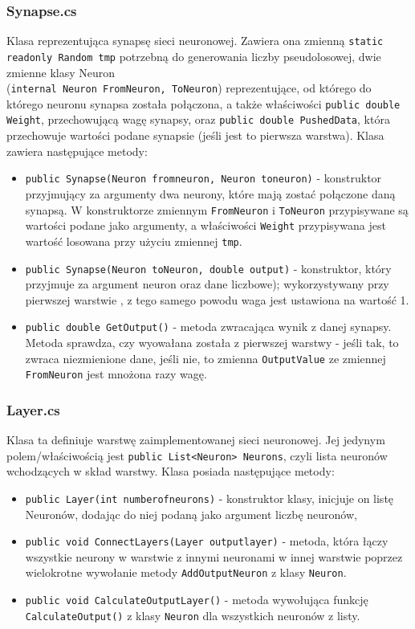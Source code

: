 \documentclass[12pt,a4paper]{article}
\begin{document}
\subsubsection*{Synapse.cs}
 \hspace{20pt} Klasa reprezentująca synapsę sieci neuronowej. Zawiera ona zmienną \lstinline{static readonly Random tmp} potrzebną do generowania liczby pseudolosowej, dwie zmienne klasy Neuron \\ (\lstinline{internal Neuron FromNeuron, ToNeuron}) reprezentujące, od którego do którego neuronu synapsa została połączona, a także właściwości \lstinline{public double Weight}, przechowującą wagę synapsy, oraz \lstinline{public double PushedData}, która przechowuje wartości podane synapsie (jeśli jest to pierwsza warstwa). Klasa zawiera następujące metody:
\begin{itemize}
    \item \lstinline{public Synapse(Neuron fromneuron, Neuron toneuron)} - konstruktor przyjmujący za argumenty dwa neurony, które mają zostać połączone daną synapsą. W konstruktorze zmiennym \lstinline{FromNeuron} i \lstinline{ToNeuron} przypisywane są wartości podane jako argumenty, a właściwości \lstinline{Weight} przypisywana jest wartość losowana przy użyciu zmiennej \lstinline{tmp}.
	\item \lstinline{public Synapse(Neuron toNeuron, double output)} - konstruktor, który przyjmuje za argument neuron oraz dane liczbowe); wykorzystywany przy pierwszej warstwie , z tego samego powodu waga jest ustawiona na wartość 1.
	\item \lstinline{public double GetOutput()} - metoda zwracająca wynik z danej synapsy. Metoda sprawdza, czy wyowałana została z pierwszej warstwy - jeśli tak, to zwraca niezmienione dane, jeśli nie, to zmienna \lstinline{OutputValue} ze zmiennej \lstinline{FromNeuron} jest mnożona razy wagę. 
	\end{itemize}
\subsubsection*{Layer.cs}
\hspace{20pt} Klasa ta definiuje warstwę zaimplementowanej sieci neuronowej. Jej jedynym polem/właściwością jest \lstinline{public List<Neuron> Neurons}, czyli lista neuronów wchodzących w skład warstwy. Klasa posiada następujące metody:
	\begin{itemize}
	    \item \lstinline{public Layer(int numberofneurons)} - konstruktor klasy, inicjuje on listę Neuronów, dodając do niej podaną jako argument liczbę neuronów, 
	    \item \lstinline{public void ConnectLayers(Layer outputlayer)} - metoda, która łączy wszystkie neurony w warstwie z innymi neuronami w innej warstwie poprzez wielokrotne wywołanie metody \lstinline{AddOutputNeuron} z klasy \lstinline{Neuron}.
	    \item \lstinline{public void CalculateOutputLayer()} - metoda wywołująca funkcję \lstinline{CalculateOutput()} z klasy \lstinline{Neuron} dla wszystkich neuronów z listy. 
	\end{itemize}
\end{document}
